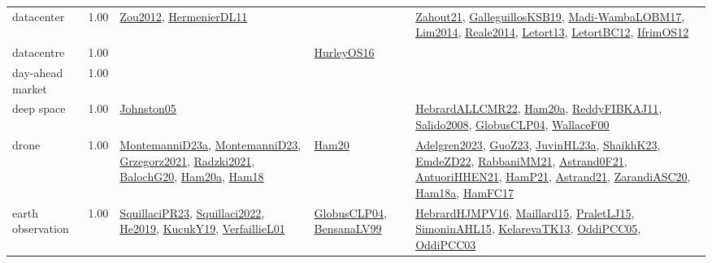 {\begin{longtable}{p{3cm}r>{\raggedright\arraybackslash}p{6cm}>{\raggedright\arraybackslash}p{6cm}>{\raggedright\arraybackslash}p{8cm}}
\index{datacenter}\index{ApplicationAreas!datacenter}datacenter &  1.00 & \hyperref[detail:Zou2012]{Zou2012}, \hyperref[detail:HermenierDL11]{HermenierDL11} &  & \hyperref[detail:Zahout21]{Zahout21}, \hyperref[detail:GalleguillosKSB19]{GalleguillosKSB19}, \hyperref[detail:Madi-WambaLOBM17]{Madi-WambaLOBM17}, \hyperref[detail:Lim2014]{Lim2014}, \hyperref[detail:Reale2014]{Reale2014}, \hyperref[detail:Letort13]{Letort13}, \hyperref[detail:LetortBC12]{LetortBC12}, \hyperref[detail:IfrimOS12]{IfrimOS12}\\
\index{datacentre}\index{ApplicationAreas!datacentre}datacentre &  1.00 &  & \hyperref[detail:HurleyOS16]{HurleyOS16} & \\
\index{day-ahead market}\index{ApplicationAreas!day-ahead market}day-ahead market &  1.00 &  &  & \\
\index{deep space}\index{ApplicationAreas!deep space}deep space &  1.00 & \hyperref[detail:Johnston05]{Johnston05} &  & \hyperref[detail:HebrardALLCMR22]{HebrardALLCMR22}, \hyperref[detail:Ham20a]{Ham20a}, \hyperref[detail:ReddyFIBKAJ11]{ReddyFIBKAJ11}, \hyperref[detail:Salido2008]{Salido2008}, \hyperref[detail:GlobusCLP04]{GlobusCLP04}, \hyperref[detail:WallaceF00]{WallaceF00}\\
\index{drone}\index{ApplicationAreas!drone}drone &  1.00 & \hyperref[detail:MontemanniD23a]{MontemanniD23a}, \hyperref[detail:MontemanniD23]{MontemanniD23}, \hyperref[detail:Grzegorz2021]{Grzegorz2021}, \hyperref[detail:Radzki2021]{Radzki2021}, \hyperref[detail:BalochG20]{BalochG20}, \hyperref[detail:Ham20a]{Ham20a}, \hyperref[detail:Ham18]{Ham18} & \hyperref[detail:Ham20]{Ham20} & \hyperref[detail:Adelgren2023]{Adelgren2023}, \hyperref[detail:GuoZ23]{GuoZ23}, \hyperref[detail:JuvinHL23a]{JuvinHL23a}, \hyperref[detail:ShaikhK23]{ShaikhK23}, \hyperref[detail:EmdeZD22]{EmdeZD22}, \hyperref[detail:RabbaniMM21]{RabbaniMM21}, \hyperref[detail:Astrand0F21]{Astrand0F21}, \hyperref[detail:AntuoriHHEN21]{AntuoriHHEN21}, \hyperref[detail:HamP21]{HamP21}, \hyperref[detail:Astrand21]{Astrand21}, \hyperref[detail:ZarandiASC20]{ZarandiASC20}, \hyperref[detail:Ham18a]{Ham18a}, \hyperref[detail:HamFC17]{HamFC17}\\
\index{earth observation}\index{ApplicationAreas!earth observation}earth observation &  1.00 & \hyperref[detail:SquillaciPR23]{SquillaciPR23}, \hyperref[detail:Squillaci2022]{Squillaci2022}, \hyperref[detail:He2019]{He2019}, \hyperref[detail:KucukY19]{KucukY19}, \hyperref[detail:VerfaillieL01]{VerfaillieL01} & \hyperref[detail:GlobusCLP04]{GlobusCLP04}, \hyperref[detail:BensanaLV99]{BensanaLV99} & \hyperref[detail:HebrardHJMPV16]{HebrardHJMPV16}, \hyperref[detail:Maillard15]{Maillard15}, \hyperref[detail:PraletLJ15]{PraletLJ15}, \hyperref[detail:SimoninAHL15]{SimoninAHL15}, \hyperref[detail:KelarevaTK13]{KelarevaTK13}, \hyperref[detail:OddiPCC05]{OddiPCC05}, \hyperref[detail:OddiPCC03]{OddiPCC03}\\

\end{longtable}}
